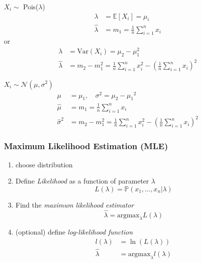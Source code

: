 \begin{examplesection}
    $X_i \sim$ Pois($\lambda$)
    \noindent\begin{align*}
        \lambda       & = \mathbb{E}[X_i] = \mu_i            \\
        \hat{\lambda} & = m_1 =\frac{1}{n}\sum_{i=1}^n {x_i}
    \end{align*}
    or
    \noindent\begin{align*}
        \lambda       & = \mathrm{Var}(X_i)=\mu_2-\mu_1^2                                                     \\
        \hat{\lambda} & =m_2-m_1^2=\frac{1}{n}\sum_{i=1}^n x_i^2-{\left(\frac{1}{n}\sum_{i=1}^n x_i\right)}^2
    \end{align*}

    $X_i \sim \mathcal{N}(\mu,\sigma^2)$
    \noindent\begin{align*}
        \mu            & = \mu_1, \quad \sigma^2 = \mu_2-{\mu_1}^2                                             \\
        \hat{\mu}      & =m_1=\frac{1}{n}\sum_{i=1}^n x_i                                                      \\
        \hat{\sigma}^2 & =m_2-m_1^2=\frac{1}{n}\sum_{i=1}^n x_i^2-{\left(\frac{1}{n}\sum_{i=1}^n x_i\right)}^2
    \end{align*}
\end{examplesection}

\subsubsection{Maximum Likelihood Estimation (MLE)}
\begin{enumerate}
    \item choose distribution
    \item Define \textit{Likelihood} as a function of parameter $\lambda$
          \noindent\begin{equation*}
              L(\lambda) = \mathbb{P}(x_1,\ldots ,x_n|\lambda)
          \end{equation*}
    \item Find the \textit{maximum likelihood estimator}
          \noindent\begin{equation*}
              \hat{\lambda} = \mathrm{argmax}_\lambda L(\lambda)
          \end{equation*}
    \item (optional) define \textit{log-likelihood function}
          \noindent\begin{align*}
              l(\lambda)    & = \ln(L(\lambda))                    \\
              \hat{\lambda} & = \mathrm{argmax}_\lambda l(\lambda)
          \end{align*}
\end{enumerate}

